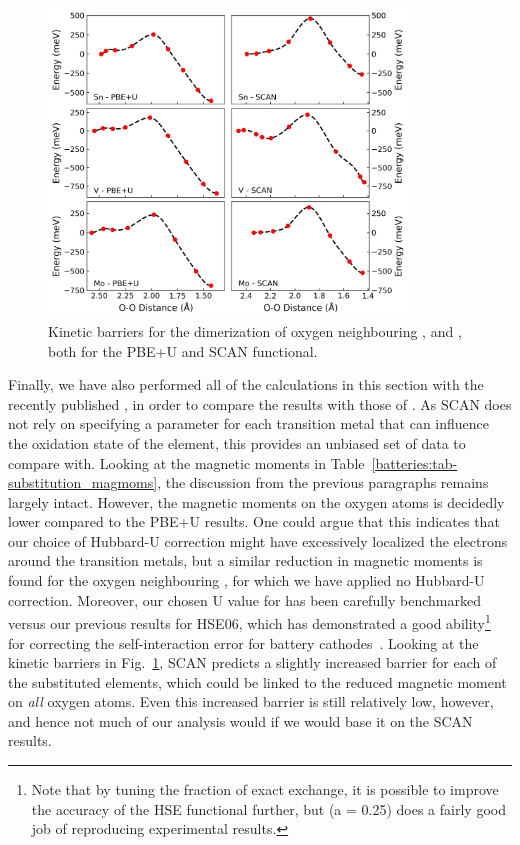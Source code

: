 \begin{refsection}
\newpage
\begin{figure}[ht] 
\centering 
\captionsetup{width=0.9\linewidth}
\includegraphics[width=0.85\textwidth]{figures/batteries/substitution_dimers.png} 
\caption{Kinetic barriers for the dimerization of oxygen neighbouring , 
 and , both for the \gls{PBE}+U and \gls{SCAN} functional.} 
\label{batteries:fig-substitution_dimers} 
\end{figure} 
 
Finally, we have also performed all of the calculations in this section with 
the recently published , in order to compare the results with 
those of . As \gls{SCAN} does not rely on specifying a parameter for each 
transition metal that can influence the oxidation state of the element, this 
provides an unbiased set of data to compare with. Looking at the magnetic 
moments in Table~\ref{batteries:tab-substitution_magmoms}, the discussion from 
the previous paragraphs remains largely intact. However, the magnetic moments 
on the oxygen atoms is decidedly lower compared to the \gls{PBE}+U results. One 
could argue that this indicates that our choice of Hubbard-U correction might 
have excessively localized the electrons around the transition metals, but a 
similar reduction in magnetic moments is found for the oxygen neighbouring 
, for which we have applied no Hubbard-U correction. Moreover, our 
chosen U value for  has been carefully benchmarked versus our previous 
results for \gls{HSE}06, which has demonstrated a good ability\footnote{Note that by 
tuning the fraction of exact exchange, it is possible to improve the accuracy 
of the \gls{HSE} functional further, but  (a = 0.25) does a fairly good job of 
reproducing experimental results.} for correcting the self-interaction error for 
battery cathodes~\cite{Seo2015}. Looking at the kinetic barriers in 
Fig.~\ref{batteries:fig-substitution_dimers}, \gls{SCAN} predicts a slightly 
increased barrier for each of the substituted elements, which could be linked 
to the reduced magnetic moment on \textit{all} oxygen atoms. Even this 
increased barrier is still relatively low, however, and hence not much of our 
analysis would if we would base it on the \gls{SCAN} results. 


\end{refsection}
